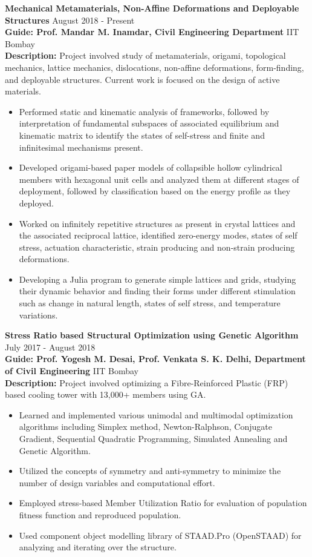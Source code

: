 
\textbf{Mechanical Metamaterials, Non-Affine Deformations and Deployable Structures } \hfill{August 2018 - Present}\\
\textbf{Guide: Prof. Mandar M. Inamdar, Civil Engineering Department} \hfill{IIT Bombay} \\
\textbf{Description:}{ Project involved study of metamaterials, origami, topological mechanics, lattice mechanics, dislocations, non-affine deformations, form-finding, and deployable structures. Current work is focused on the design of active materials.}
\begin{itemize}
    \setlength\itemsep{0.7mm}
    \item Performed static and kinematic analysis of frameworks, followed by interpretation of fundamental subspaces of associated equilibrium and kinematic matrix to identify the states of self-stress and finite and infinitesimal mechanisms present. 
    \item Developed origami-based paper models of collapsible hollow cylindrical members with hexagonal unit cells and analyzed them at different stages of deployment, followed by classification based on the energy profile as they deployed.
    \item Worked on infinitely repetitive structures as present in crystal lattices and the associated reciprocal lattice, identified zero-energy modes, states of self stress, actuation characteristic, strain producing and non-strain producing deformations.
    \item Developing a Julia program to generate simple lattices and grids, studying their dynamic behavior and finding their forms under different stimulation such as change in natural length, states of self stress, and temperature variations.
\end{itemize}


\textbf{Stress Ratio based Structural Optimization using Genetic Algorithm} \hfill{July 2017 - August 2018}\\
\textbf{Guide: Prof. Yogesh M. Desai, Prof. Venkata S. K. Delhi, Department of Civil Engineering} \hfill{IIT Bombay} \\
\textbf{Description: }{Project involved optimizing a Fibre-Reinforced Plastic (FRP) based cooling tower with 13,000+ members using GA.}
\begin{itemize}
    \setlength\itemsep{0.7mm}
    \item Learned and implemented various unimodal and multimodal optimization algorithms including Simplex method, Newton-Ralphson, Conjugate Gradient, Sequential Quadratic Programming, Simulated Annealing and Genetic Algorithm.
    \item Utilized the concepts of symmetry and anti-symmetry to minimize the number of design variables and computational effort.
    \item Employed stress-based Member Utilization Ratio for evaluation of population fitness function and reproduced population.
    \item Used component object modelling library of STAAD.Pro (OpenSTAAD) for analyzing and iterating over the structure.
\end{itemize}

